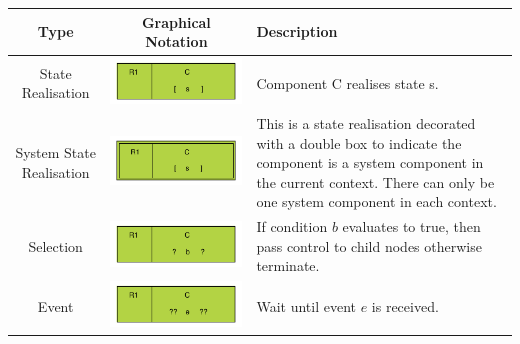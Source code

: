 \documentclass[]{article}
\begin{document}
\begin{tabularx}{\textwidth}{|c|c|X|}
\textbf{Type} & \textbf{Graphical Notation} & \textbf{Description}\\ \hline
State Realisation &\includegraphics{figs/AppendixB/BasicNodes/StateRealisation} & Component C realises state s.\\ \hline
System State Realisation &\includegraphics{figs/AppendixB/BasicNodes/SystemStateRealisation}& This is a state realisation decorated with a double box to indicate the component is a system component in the current context. There can only be one system component in each context.\\ \hline
Selection &\includegraphics{figs/AppendixB/BasicNodes/Selection} & If condition $b$ evaluates to true, then pass control to child nodes otherwise terminate.\\ \hline
Event &\includegraphics{figs/AppendixB/BasicNodes/Event} & Wait until event $e$ is received.\\ \hline

\end{tabularx}
\end{document}
